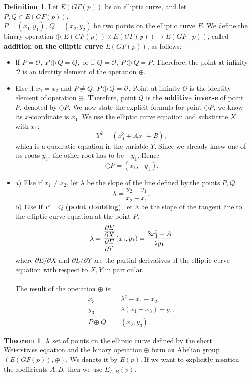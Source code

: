 \documentclass[thesis=M,english]{FITthesis}[2012/10/20]
\theoremstyle{remark}
\theoremstyle{definition}
\newtheorem{DF}{Definition}[section]
\newtheorem{theorem}{Theorem}[section]
\begin{document}
\begin{DF}
Let $E(GF(p))$ be an elliptic curve, and let $P,Q \in E(GF(p)),$\\${P=(x_1,y_1),\ Q=(x_2,y_2)}$ be two points on the elliptic curve $E$. We define the binary operation $\oplus: E(GF(p)) \times E(GF(p)) \to E(GF(p))$, called \textbf{addition on the elliptic curve} $E(GF(p))$, as follows:
\begin{itemize}
\item If $P = \mathcal{O},\ P \oplus Q = Q,$ or if $Q = \mathcal{O},\ P \oplus Q = P.$ Therefore, the point at infinity $\mathcal{O}$ is an identity element of the operation $\oplus$.
\item Else if $x_1 = x_2$ and $P\neq Q$, $P\oplus Q = \mathcal{O}.$ Point at infinity $\mathcal{O}$ is the identity element of operation $\oplus$. Therefore, point $Q$ is the \textbf{additive inverse} of point $P$, denoted by $\ominus P$. We now state the explicit formula for point $\ominus P$, we know its $x$-coordinate is $x_1$. We use the elliptic curve equation and substitute $X$ with $x_1$:
$$
Y^2  = (x_1^3 + Ax_1 + B),
$$
which is a quadratic equation in the variable $Y$. Since we already know one of its roots $y_1$, the other root has to be $-y_1$. Hence
$$\ominus P = (x_1, -y_1).$$
\item a) Else if $x_1 \neq x_2$, let $\lambda$ be the slope of the line defined by the points $P,Q.$
$$
\lambda = \frac{y_2 - y_1}{x_2 - x_1},
$$
b) Else if $P = Q$ (\textbf{point doubling}), let $\lambda$ be the slope of the tangent line to the elliptic curve equation at the point $P.$
$$
\lambda = \mathlarger{\mathlarger{\frac{\frac{\partial E}{\partial X}}{\frac{\partial E}{\partial Y}}}}(x_1, y_1) = \frac{3x_1^2+ A}{2y_1}, 
$$
where $\partial E/\partial X$ and  $\partial E/\partial Y$ are the partial derivatives of the elliptic curve equation with respect to $X,Y$ in particular. \\ \\
\noindent The result of the operation $\oplus$ is:
\begin{align*}
x_3 &= \lambda^2 - x_1 - x_2, \\
y_3 &= \lambda(x_1 - x_3) - y_1, \\ 
 P \oplus Q &= (x_3, y_3).
\end{align*}
\end{itemize}
\end{DF}
\begin{theorem}
A set of points on the elliptic curve defined by the short Weierstrass equation and the binary operation $\oplus$ form an Abelian group $(E(GF(p)), \oplus)$. We denote it by $E(p)$. If we want to explicitly mention the coefficients $A,B$, then we use $E_{A,B}(p)$.
\end{theorem}
\end{document}
